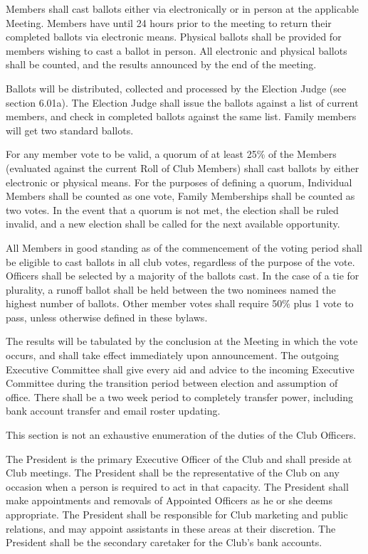 \documentclass{bylaws}
\begin{document}
Members shall cast ballots either via electronically or in person at the applicable Meeting.  Members have until 24 hours prior to the meeting to return their completed ballots via electronic means. Physical ballots shall be provided for members wishing to cast a ballot in person. All electronic and physical ballots shall be counted, and the results announced by the end of the meeting.
 
Ballots will be distributed, collected and processed by the Election Judge (see section 6.01a). The Election Judge shall issue the ballots against a list of current members, and check in completed ballots against the same list. Family members will get two standard ballots.

For any member vote to be valid, a quorum of at least 25\% of the Members (evaluated against the current Roll of Club Members) shall cast ballots by either electronic or physical means. For the purposes of defining a quorum, Individual Members shall be counted as one vote, Family Memberships shall be counted as two votes. In the event that a quorum is not met, the election shall be ruled invalid, and a new election shall be called for the next available opportunity. 

All Members in good standing as of the commencement of the voting period shall be eligible to cast ballots in all club votes, regardless of the purpose of the vote. Officers shall be selected by a majority of the ballots cast. In the case of a tie for plurality, a runoff ballot shall be held between the two nominees named the highest number of ballots. Other member votes shall require 50\% plus 1 vote to pass, unless otherwise defined in these bylaws. 

The results will be tabulated by the conclusion at the Meeting in which the vote occurs, and shall take effect immediately upon announcement. The outgoing Executive Committee shall give every aid and advice to the incoming Executive Committee during the transition period between election and assumption of office. There shall be a two week period to completely transfer power, including bank account transfer and email roster updating. 

This section is not an exhaustive enumeration of the duties of the Club Officers. 

The President is the primary Executive Officer of the Club and shall preside at Club meetings. The President shall be the representative of the Club on any occasion when a person is required to act in that capacity. The President shall make appointments and removals of Appointed Officers as he or she deems appropriate. The President shall be responsible for Club marketing and public relations, and may appoint assistants in these areas at their discretion. The President shall be the secondary caretaker for the Club's bank accounts. 
\end{document}
